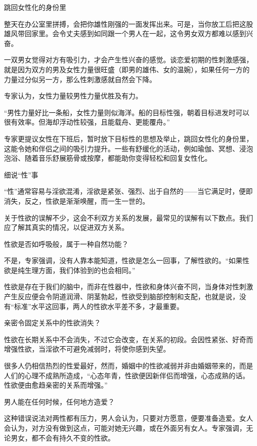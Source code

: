 \documentclass[12pt,UTF8]{ctexbook}
\begin{document}
跳回女性化的身份里

整天在办公室里拼搏，会把你雄性刚强的一面发挥出来。可是，当你放工后把这股雄风带回家里。会令丈夫感到如同跟一个男人在一起，这令男女双方都难以感到兴奋。

一双男女觉得对方有吸引力，才会产生性兴奋的感觉。谈恋爱初期的性刺激感强，就是因为双方的男及女性力量很旺盛（即男的雄伟、女的温婉），如果任何一方的力量过分似另一方，那么性刺激感就自然会下降。

专家认为，女性力量较男性力量优胜及有力。

“男性力量好比一条船，女性力量则似海洋。船的目标性强，朝着目标进发时可以很有效率。但海却浮动性较强，且能载舟、更能覆舟。”

专家更提议女性在下班后，暂时放下目标性的思想及举止，跳回女性化的身份里，这能令她和伴侣之间的吸引力提升。一些有舒缓化的活动，例如瑜伽、冥想、浸泡泡浴、随着音乐舒展筋骨或按摩，都能助你变得轻松和回复女性化。





细说“性”事


“性”通常容易与淫欲混淆，淫欲是紧张、强烈、出于自然的——当它满足时，便即消失，反之，性欲是渐渐唤醒，而一生一世的。

关于性欲的误解不少，这会不利双方关系的发展，最常见的误解有以下数点。我们应了解其真实的情况，以促进双方关系。

性欲是否如呼吸般，属于一种自然功能？

不是，专家强调，没有人靠本能知道，性欲是怎么一回事，了解性欲的。“如果性欲是纯生理方面，我们体验到的也会相同。”

性欲是存在于我们的脑中，而非在性器中，性欲和身体兴奋不同，当身体对性刺激产生反应便会令阴道润滑、阴茎勃起，性欲受到脑部控制和支配，也就是说，没有“标准”水平这回事，两人的性欲水平差不多，才最重要。

亲密令固定关系中的性欲消失？

性欲在长期关系中不会消失，不过它会改变，在关系的初段。会因性紧张、好奇而增强性欲，当淫欲不可避免减弱时，将使你感到失望。

很多人仍相信热烈的性爱最好，然而，婚姻中的性欲减弱并非由婚姻带来的，而是人们的心理不成熟所造成，“心态年青，性欲便因新伴侣而增强，心态成熟的话。性欲便由愈趋亲密的关系而增强。”

男人能在任何时候，任何地方造爱？

这种错误说法对两性都有压力，男人会认为，只要对方愿意，便要准备造爱。女人会认为，对方没有做到这点，可能对她无兴趣，或在外面另有女人。专家强调，无论男女，都不会有持久不变的性欲。
\end{document}
